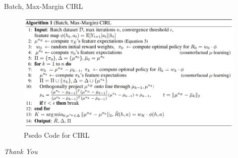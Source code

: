 \documentclass{beamer}
\begin{document}
\begin{frame}{Batch, Max-Margin CIRL}

    \begin{figure}
        \centering
        \includegraphics[width=0.9\linewidth]{fig3.png}
        \caption{Psedo Code for CIRL}
        \label{fig3}
    \end{figure}
    
\end{frame}

        


\begin{frame}{}
  \centering \Large
  \emph{Thank You}
\end{frame}
\end{document}
